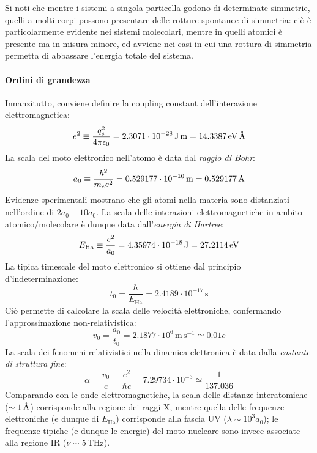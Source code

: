 Si noti che mentre i sistemi a singola particella godono di determinate simmetrie, quelli a molti corpi possono presentare delle rotture spontanee di simmetria: ciò è particolarmente evidente nei sistemi molecolari, mentre in quelli atomici è presente ma in misura minore, ed avviene nei casi in cui una rottura di simmetria permetta di abbassare l'energia totale del sistema.

\paragraph{Ordini di grandezza}

Innanzitutto, conviene definire la coupling constant dell'interazione elettromagnetica:
\begin{equation*}
	e^2 \equiv \frac{q_e^2}{4\pi \epsilon_0} = 2.3071 \cdot 10^{-28} \,\text{J} \,\text{m} = 14.3387 \,\mathrm{eV} \,\text{\AA}
\end{equation*}
La scala del moto elettronico nell'atomo è data dal \textit{raggio di Bohr}:
\begin{equation*}
	a_0 \equiv \frac{\hbar^2}{m_e e^2} = 0.529177 \cdot 10^{-10} \,\text{m} = 0.529177 \,\text{\AA}
\end{equation*}
Evidenze sperimentali mostrano che gli atomi nella materia sono distanziati nell'ordine di $ 2a_0 - 10a_0 $. La scala delle interazioni elettromagnetiche in ambito atomico/molecolare è dunque data dall'\textit{energia di Hartree}:
\begin{equation*}
	E_\text{Ha} \equiv \frac{e^2}{a_0} = 4.35974 \cdot 10^{-18} \,\text{J} = 27.2114 \,\mathrm{eV}
\end{equation*}
La tipica timescale del moto elettronico si ottiene dal principio d'indeterminazione:
\begin{equation*}
	t_0 = \frac{\hbar}{E_\text{Ha}} = 2.4189 \cdot 10^{-17} \,\text{s}
\end{equation*}
Ciò permette di calcolare la scala delle velocità elettroniche, confermando l'approssimazione non-relativistica:
\begin{equation*}
	v_0 = \frac{a_0}{t_0} = 2.1877 \cdot 10^6 \,\text{m} \,\text{s}^{-1} \simeq 0.01 c
\end{equation*}
La scala dei fenomeni relativistici nella dinamica elettronica è data dalla \textit{costante di struttura fine}:
\begin{equation*}
	\alpha = \frac{v_0}{c} = \frac{e^2}{\hbar c} = 7.29734 \cdot 10^{-3} \simeq \frac{1}{137.036}
\end{equation*}
Comparando con le onde elettromagnetiche, la scala delle distanze interatomiche ($ \sim 1\,\text{\AA} $) corrisponde alla regione dei raggi X, mentre quella delle frequenze elettroniche (e dunque di $ E_\text{Ha} $) corrisponde alla fascia UV ($ \lambda \sim 10^3 a_0 $); le frequenze tipiche (e dunque le energie) del moto nucleare sono invece associate alla regione IR ($ \nu \sim 5 \,\text{THz} $).

